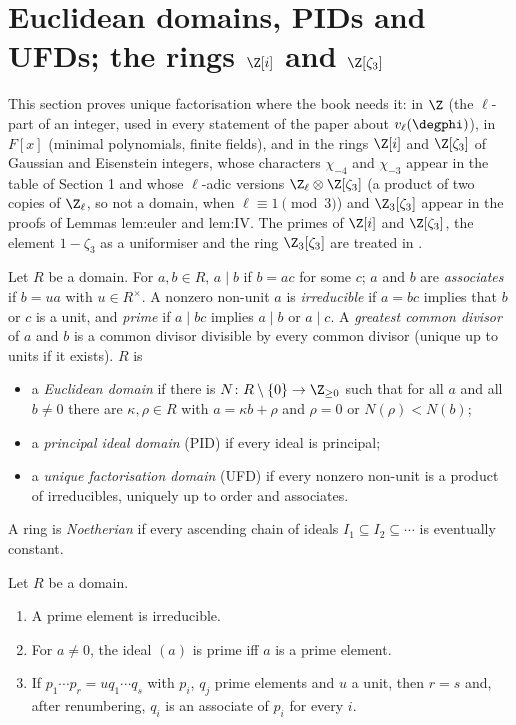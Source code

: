 \section[Euclidean domains, PIDs, UFDs]{Euclidean domains, PIDs and UFDs; the rings \texorpdfstring{$\Z[i]$}{Z[i]} and \texorpdfstring{$\Z[\zeta_3]$}{Z[zeta3]}}\label{sec:rings:ufd}

This section proves unique factorisation where the book needs it: in $\Z$ (the $\ell$-part of an integer, used in every
statement of the paper about $v_\ell(\degphi)$), in $F[x]$ (minimal polynomials, finite fields), and in the rings $\Z[i]$ and
$\Z[\zeta_3]$ of Gaussian and Eisenstein integers, whose characters $\chi_{-4}$ and $\chi_{-3}$ appear in the table of Section 1 and
whose $\ell$-adic versions $\Z_\ell\otimes\Z[\zeta_3]$ (a product of two copies of $\Z_\ell$, so not a domain, when
$\ell\equiv1\pmod3$) and $\Z_3[\zeta_3]$ appear in the proofs of Lemmas lem:euler and lem:IV. The primes of $\Z[i]$ and
$\Z[\zeta_3]$, the element $1-\zeta_3$ as a uniformiser and the ring $\Z_3[\zeta_3]$ are treated in .

\begin{definition}\label{def:rings:factorisation}
Let $R$ be a domain. For $a,b\in R$, $a\mid b$ if $b=ac$ for some $c$; $a$ and $b$ are \emph{associates} if $b=ua$ with $u\in R^\times$. A nonzero
non-unit $a$ is \emph{irreducible} if $a=bc$ implies that $b$ or $c$ is a unit, and \emph{prime} if $a\mid bc$ implies $a\mid b$ or $a\mid c$. A
\emph{greatest common divisor} of $a$ and $b$ is a common divisor divisible by every common divisor (unique up to units if it
exists). $R$ is
\begin{itemize}
\item a \emph{Euclidean domain} if there is $N\colon R\setminus\{0\}\to\Z_{\ge0}$ such that for all $a$ and all $b\ne0$ there are $\kappa,\rho\in R$ with
$a=\kappa b+\rho$ and $\rho=0$ or $N(\rho)<N(b)$;
\item a \emph{principal ideal domain} (PID) if every ideal is principal;
\item a \emph{unique factorisation domain} (UFD) if every nonzero non-unit is a product of irreducibles, uniquely up to order and
associates.
\end{itemize}
A ring is \emph{Noetherian} if every ascending chain of ideals $I_1\subseteq I_2\subseteq\cdots$ is eventually constant.
\end{definition}

\begin{lemma}\label{lem:rings:prime-irreducible}
Let $R$ be a domain.
\begin{enumerate}[label=(\roman*)]
\item A prime element is irreducible.
\item For $a\ne0$, the ideal $(a)$ is prime iff $a$ is a prime element.
\item If $p_1\cdots p_r=uq_1\cdots q_s$ with $p_i$, $q_j$ prime elements and $u$ a unit, then $r=s$ and, after renumbering, $q_i$ is an
associate of $p_i$ for every $i$.
\end{enumerate}
\end{lemma}

